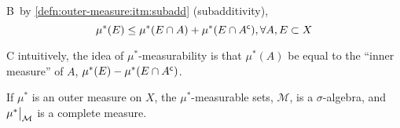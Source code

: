 \begin{rem}{B}\label{rem:01:outer-measurable}\
  by \ref{defn:outer-measure:itm:subadd} (subadditivity),
  \[
  \mu^*(E)\leq \mu^*(E\cap A) +\mu^*(E\cap{A}^{\mathsf{c}}),
  \forall A, E\subset X
  \]
\end{rem}

\begin{rem}{C}
  intuitively, the idea of $\mu^*$-measurability is that
  ${\mu^*(A)}$ be equal to the ``inner measure'' of $A$,
  ${\mu^*(E) - \mu^*(E\cap{A}^{\mathsf{c}})}$.
\end{rem}

\begin{thm}\label{thm:1.11}\label{thm:caratheodory}
  If $\mu^*$ is an outer measure on $X$,
  the $\mu^*$-measurable sets, $\mathcal{M}$, is a $\sigma$-algebra,
  and ${\restr{\mu^*}{\mathcal{M}}}$ is a complete measure.
\end{thm}
